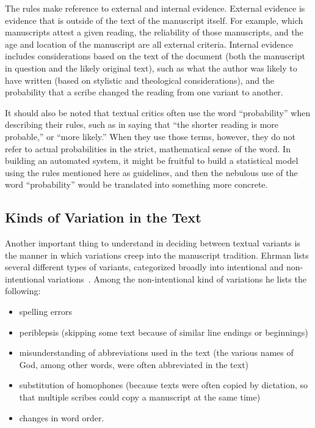 \documentclass[onecolumn, 12pt]{article}
\begin{document}
The rules make reference to external and internal evidence.  External evidence
is evidence that is outside of the text of the manuscript itself.  For example,
which manuscripts attest a given reading, the reliability of those manuscripts,
and the age and location of the manuscript are all external criteria.  Internal
evidence includes considerations based on the text of the document (both the
manuscript in question and the likely original text), such as what the author
was likely to have written (based on stylistic and theological considerations),
and the probability that a scribe changed the reading from one variant to
another.

It should also be noted that textual critics often use the word ``probability''
when describing their rules, such as in saying that ``the shorter reading is
more probable,'' or ``more likely.''  When they use those terms, however, they
do not refer to actual probabilities in the strict, mathematical sense of the
word.  In building an automated system, it might be fruitful to build a
statistical model using the rules mentioned here as guidelines, and then the
nebulous use of the word ``probability'' would be translated into something
more concrete.

\subsection{Kinds of Variation in the Text}

Another important thing to understand in deciding between textual variants is
the manner in which variations creep into the manuscript tradition.  Ehrman
lists several different types of variants, categorized broadly into intentional
and non-intentional variations~\cite[pp. 90--98]{ehrman-2005-misquoting-jesus}.
Among the non-intentional kind of variations he lists the following:

\begin{itemize}
  \item spelling errors
  \item periblepsis (skipping some text because of similar line endings or
	beginnings)
  \item misunderstanding of abbreviations used in the text (the various names
	of God, among other words, were often abbreviated in the text)
  \item substitution of homophones (because texts were often copied by
	dictation, so that multiple scribes could copy a manuscript at the same
	time)
  \item changes in word order.  
\end{itemize}
\end{document}
